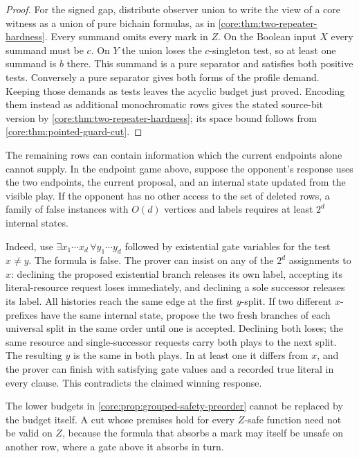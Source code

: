 \begin{proof}
For the signed gap, distribute observer union to write the view of
a core witness as a union of pure bichain formulas, as in
\cref{core:thm:two-repeater-hardness}. Every summand omits every
mark in $Z$. On the Boolean input $X$ every summand must be $c$.
On $Y$ the union loses the $c$-singleton test, so at least one
summand is $b$ there. This summand is a pure separator and satisfies
both positive tests. Conversely a pure separator gives both forms
of the profile demand. Keeping those demands as tests leaves the
acyclic budget just proved. Encoding them instead as additional
monochromatic rows gives the stated source-bit version by
\cref{core:thm:two-repeater-hardness}; its space bound follows
from \cref{core:thm:pointed-guard-cut}.
\end{proof}

The remaining rows can contain information which the current endpoints
alone cannot supply. In the endpoint game above, suppose the opponent's
response uses the two endpoints, the current proposal, and an internal
state updated from the visible play. If the opponent has no other
access to the set of deleted rows, a family of false instances with
$O(d)$ vertices and labels requires at least $2^d$ internal states.

Indeed, use $\exists x_1\cdots x_d\,\forall y_1\cdots y_d$ followed by
existential gate variables for the test $x\ne y$. The formula is false.
The prover can insist on any of the $2^d$ assignments to $x$: declining
the proposed existential branch releases its own label, accepting its
literal-resource request loses immediately, and declining a sole
successor releases its label. All histories reach the same edge at the
first $y$-split. If two different $x$-prefixes have the same internal
state, propose the two fresh branches of each universal split in the
same order until one is accepted. Declining both loses; the same
resource and single-successor requests carry both plays to the next
split. The resulting $y$ is the same in both plays. In at least one
it differs from $x$, and the prover can finish with satisfying gate
values and a recorded true literal in every clause. This contradicts
the claimed winning response.

The lower budgets in \cref{core:prop:grouped-safety-preorder} cannot
be replaced by the budget itself. A cut whose premises hold for every
$Z$-safe function need not be valid on $Z$, because the formula that
absorbs a mark may itself be unsafe on another row, where a gate above
it absorbs in turn.

